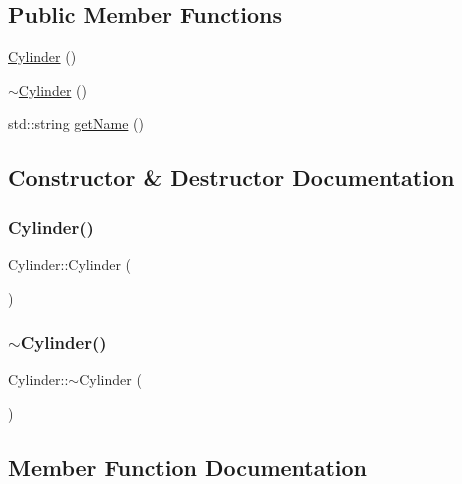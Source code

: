 \subsection*{Public Member Functions}
\begin{DoxyCompactItemize}
\item 
\mbox{\hyperlink{class_cylinder_a01dc978cb576f834b9545e43d4dad2a2}{Cylinder}} ()
\item 
\mbox{\hyperlink{class_cylinder_a05ab556f0ae3cd6e99d9d1f3caca80b3}{$\sim$\+Cylinder}} ()
\item 
std\+::string \mbox{\hyperlink{class_cylinder_afdb7f76b3f02471d638c36127395d181}{get\+Name}} ()
\end{DoxyCompactItemize}


\subsection{Constructor \& Destructor Documentation}
\mbox{\label{class_cylinder_a01dc978cb576f834b9545e43d4dad2a2}} 
\subsubsection{\texorpdfstring{Cylinder()}{Cylinder()}}
{\footnotesize\ttfamily Cylinder\+::\+Cylinder (\begin{DoxyParamCaption}{ }\end{DoxyParamCaption})}

\mbox{\label{class_cylinder_a05ab556f0ae3cd6e99d9d1f3caca80b3}} 
\subsubsection{\texorpdfstring{$\sim$Cylinder()}{~Cylinder()}}
{\footnotesize\ttfamily Cylinder\+::$\sim$\+Cylinder (\begin{DoxyParamCaption}{ }\end{DoxyParamCaption})}



\subsection{Member Function Documentation}
\mbox{\label{class_cylinder_afdb7f76b3f02471d638c36127395d181}} 
